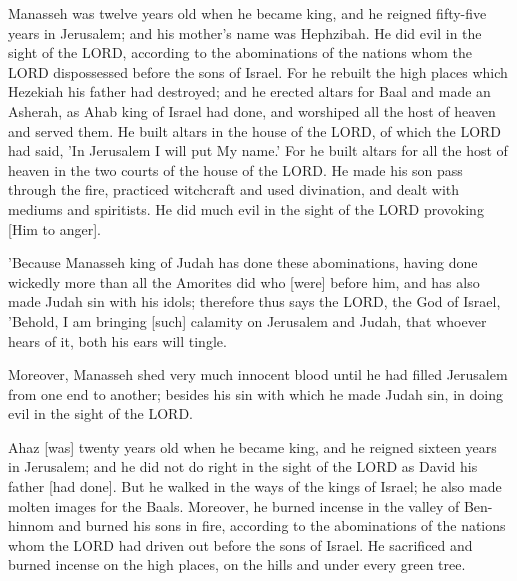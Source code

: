 \begin{scripture}[2 Kings 21:1-6]
    Manasseh was twelve years old when he became king, and he reigned fifty-five years in Jerusalem; and his mother's name was Hephzibah.
    He did evil in the sight of the LORD, according to the abominations of the nations whom the LORD dispossessed before the sons of Israel.
    For he rebuilt the high places which Hezekiah his father had destroyed; and he erected altars for Baal and made an Asherah, as Ahab king of Israel had done, and worshiped all the host of heaven and served them.
    He built altars in the house of the LORD, of which the LORD had said, 'In Jerusalem I will put My name.'
    For he built altars for all the host of heaven in the two courts of the house of the LORD.
    He made his son pass through the fire, practiced witchcraft and used divination, and dealt with mediums and spiritists. He did much evil in the sight of the LORD provoking [Him to anger].
\end{scripture}

\begin{scripture}[2 Kings 21:11-12]
    'Because Manasseh king of Judah has done these abominations, having done wickedly more than all the Amorites did who [were] before him, and has also made Judah sin with his idols;
    therefore thus says the LORD, the God of Israel, 'Behold, I am bringing [such] calamity on Jerusalem and Judah, that whoever hears of it, both his ears will tingle.
\end{scripture}

\begin{scripture}[2 Kings 21:16]
    Moreover, Manasseh shed very much innocent blood until he had filled Jerusalem from one end to another; besides his sin with which he made Judah sin, in doing evil in the sight of the LORD.
\end{scripture}

\begin{scripture}[2 Chronicles 28:1-4]
    Ahaz [was] twenty years old when he became king, and he reigned sixteen years in Jerusalem; and he did not do right in the sight of the LORD as David his father [had done].
    But he walked in the ways of the kings of Israel; he also made molten images for the Baals.
    Moreover, he burned incense in the valley of Ben-hinnom and burned his sons in fire, according to the abominations of the nations whom the LORD had driven out before the sons of Israel.
    He sacrificed and burned incense on the high places, on the hills and under every green tree.
\end{scripture}

